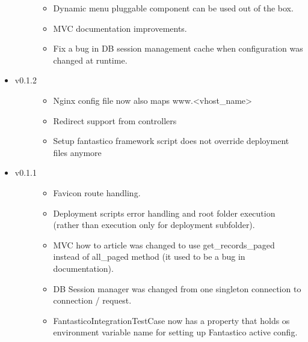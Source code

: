 \documentclass[letterpaper,10pt,english]{sphinxmanual}
\begin{document}
\begin{itemize}
\begin{description}
\begin{itemize}
\item {} 
Dynamic menu pluggable component can be used out of the box.

\item {} 
MVC documentation improvements.

\item {} 
Fix a bug in DB session management cache when configuration was changed at runtime.

\end{itemize}

\end{description}

\item {} \begin{description}
\item[{v0.1.2}] \leavevmode\begin{itemize}
\item {} 
Nginx config file now also maps www.\textless{}vhost\_name\textgreater{}

\item {} 
Redirect support from controllers

\item {} 
Setup fantastico framework script does not override deployment files anymore

\end{itemize}

\end{description}

\item {} \begin{description}
\item[{v0.1.1}] \leavevmode\begin{itemize}
\item {} 
Favicon route handling.

\item {} 
Deployment scripts error handling and root folder execution (rather than execution only for deployment subfolder).

\item {} 
MVC how to article was changed to use get\_records\_paged instead of all\_paged method (it used to be a bug in documentation).

\item {} 
DB Session manager was changed from one singleton connection to connection / request.

\item {} 
FantasticoIntegrationTestCase now has a property that holds os environment variable name for setting up Fantastico active config.


\end{itemize}
\end{description}
\end{itemize}
\end{document}
